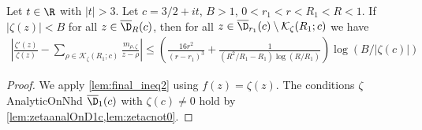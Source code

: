 \begin{lemma}\label{lem:log_Deriv_Expansion_Zeta}  \leanok
Let $t\in\R$ with $|t|>3$. Let $c=3/2+it$, $B>1$, $0<r_1<r<R_1<R<1$.
If $|\zeta(z)| < B$ for all $z\in \overline{\D}_R(c)$, then for all $z\in\overline{\D}_{r_1}(c)\setminus \mathcal K_\zeta(R_1;c)$ we have
\begin{align*}
\left|\frac{\zeta'(z)}{\zeta(z)} - \sum_{\rho\in\mathcal K_{\zeta}(R_1;c)} \frac{m_{\rho,\zeta}}{z-\rho} \right| \le \left(\frac{16 r^2}{(r-r_1)^3} + \frac{1}{(R^2/R_1 - R_1)\log(R/R_1)}\right) \log(B/|\zeta(c)|)
\end{align*}
\end{lemma}
\begin{proof}
\leanok
We apply \cref{lem:final_ineq2} using $f(z) = \zeta(z)$.
The conditions $\zeta$ AnalyticOnNhd $\overline{\D}_1(c)$ with $\zeta(c)\neq 0$ hold by \cref{lem:zetaanalOnD1c,lem:zetacnot0}.
\end{proof}

